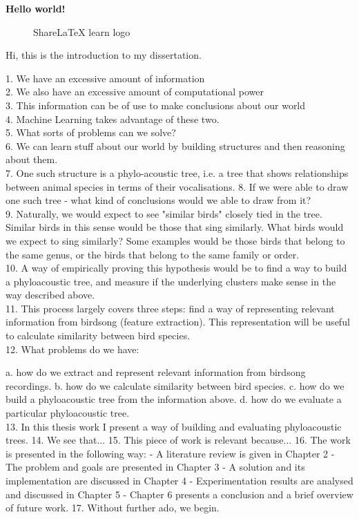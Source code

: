 \documentclass[../main.tex]{subfiles}
\begin{document}
\textbf{Hello world!}
 
\begin{figure}[bh]
\centering
 
\label{fig:img1}
\caption{ShareLaTeX learn logo}
\end{figure}
 
Hi, this is the introduction to my dissertation.

1. We have an excessive amount of information\\
2. We also have an excessive amount of computational power\\
3. This information can be of use to make conclusions about our world\\
4. Machine Learning takes advantage of these two.\\
5. What sorts of problems can we solve? \\
6. We can learn stuff about our world by building structures and then reasoning about them. \\
7. One such structure is a phylo-acoustic tree, i.e. a tree that shows relationships between animal species in terms of their vocalisations. 
8. If we were able to draw one such tree - what kind of conclusions would we able to draw from it? \\
9. Naturally, we would expect to see "similar birds" closely tied in the tree. Similar birds in this sense would be those that sing similarly. What birds would we expect to sing similarly? Some examples would be those birds that belong to the same genus, or the birds that belong to the same family or order. \\
10. A way of empirically proving this hypothesis would be to find a way to build a phyloacoustic tree, and measure if the underlying clusters make sense in the way described above.\\
11. This process largely covers three steps: find a way of representing relevant information from birdsong (feature extraction). This representation will be useful to calculate similarity between bird species. \\
12. What problems do we have:

a. how do we extract and represent relevant information from birdsong recordings.
b. how do we calculate similarity between bird species.
c. how do we build a phyloacoustic tree from the information above.
d. how do we evaluate a particular phyloacoustic tree.\\
13. In this thesis work I present a way of building and evaluating phyloacoustic trees. 
14. We see that...
15. This piece of work is relevant because...
16. The work is presented in the following way:
- A literature review is given in Chapter 2
- The problem and goals are presented in Chapter 3
- A solution and its implementation are discussed in Chapter 4
- Experimentation results are analysed and discussed in Chapter 5
- Chapter 6 presents a conclusion and a brief overview of future work.
17. Without further ado, we begin. \cite{Awatade2012}
\end{document}
